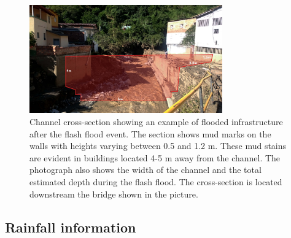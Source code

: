 \documentclass[hess, manuscript]{copernicus}
\begin{document}
\begin{figure}[t]
\centering
    \includegraphics[width=8.3cm]{Figures/Salgar_SeccionAguasAbajo.jpg}
    \caption{Channel cross-section showing an example of flooded infrastructure after the flash flood event. The section shows mud marks on the walls with heights varying between 0.5 and 1.2 m. These mud stains are evident in buildings located 4-5 m away from the channel. The photograph also shows the width of the channel and the total estimated depth during the flash flood. The cross-section is located downstream the bridge shown in the picture.}
    \label{fig:Seccion}
\end{figure}

\subsection{Rainfall information}
\end{document}
